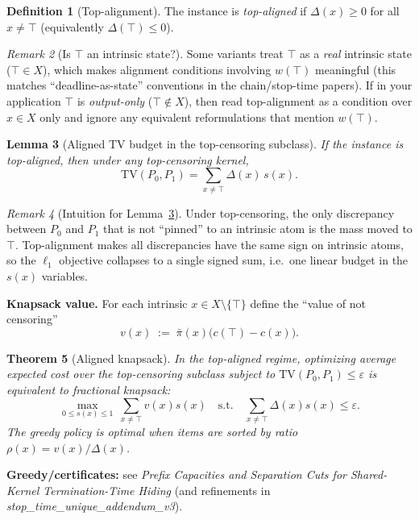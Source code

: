 \documentclass[11pt]{article}
\newtheorem{theorem}{Theorem}
\newtheorem{lemma}[theorem]{Lemma}
\theoremstyle{definition}
\newtheorem{definition}[theorem]{Definition}
\theoremstyle{remark}
\newtheorem{remark}[theorem]{Remark}
\newcommand{\TV}{\mathrm{TV}}
\begin{document}
\begin{definition}[Top-alignment]\label{def:topalignment}
The instance is \emph{top-aligned} if $\Delta(x)\ge 0$ for all $x\neq \top$ (equivalently $\Delta(\top)\le 0$).
\end{definition}

\begin{remark}[Is $\top$ an intrinsic state?]
Some variants treat $\top$ as a \emph{real} intrinsic state ($\top\in X$), which makes alignment conditions involving $w(\top)$ meaningful (this matches ``deadline-as-state'' conventions in the chain/stop-time papers).
If in your application $\top$ is \emph{output-only} ($\top\notin X$), then read top-alignment as a condition over $x\in X$ only and ignore any equivalent reformulations that mention $w(\top)$.
\end{remark}


\begin{lemma}[Aligned TV budget in the top-censoring subclass]\label{lem:tvcollapse}
If the instance is top-aligned, then under any top-censoring kernel,
\[
\TV(P_0,P_1)=\sum_{x\neq \top} \Delta(x)\, s(x).
\]
\end{lemma}

\begin{remark}[Intuition for Lemma~\ref{lem:tvcollapse}]
Under top-censoring, the only discrepancy between $P_0$ and $P_1$ that is not ``pinned'' to an intrinsic atom is the mass moved to $\top$.
Top-alignment makes all discrepancies have the same sign on intrinsic atoms, so the $\ell_1$ objective collapses to a single signed sum, i.e.\ one linear budget in the $s(x)$ variables.
\end{remark}



\noindent\textbf{Knapsack value.} For each intrinsic $x\in X\setminus\{\top\}$ define the ``value of not censoring'' 
\[
v(x)\;:=\;\bar\pi(x)\big(c(\top)-c(x)\big).
\]

\begin{theorem}[Aligned knapsack]\label{thm:knapsack}
In the top-aligned regime, optimizing average expected cost over the top-censoring subclass subject to $\TV(P_0,P_1)\le \varepsilon$
is equivalent to fractional knapsack:
\[
\max_{0\le s(x)\le 1}\ \sum_{x\neq \top} v(x)s(x)
\quad \text{s.t.}\quad \sum_{x\neq \top}\Delta(x)s(x)\le \varepsilon.
\]
The greedy policy is optimal when items are sorted by ratio $\rho(x)=v(x)/\Delta(x)$.
\end{theorem}

\noindent\textbf{Greedy/certificates:} see \emph{Prefix Capacities and Separation Cuts for Shared-Kernel Termination-Time Hiding} (and refinements in \emph{stop\_time\_unique\_addendum\_v3}).
\end{document}
